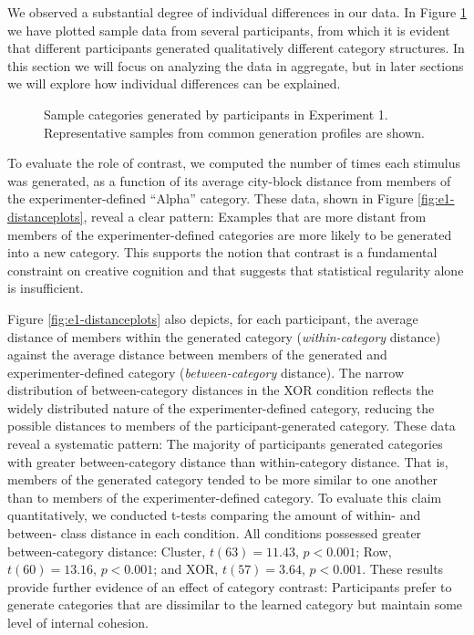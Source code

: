 \documentclass[12pt]{article}
\newcommand\inputpgf[2]{{
\let\pgfimageWithoutPath\pgfimage
\renewcommand{\pgfimage}[2][]{\pgfimageWithoutPath[##1]{#1/##2}}

}}
\begin{document}
\begin{flushleft}
We observed a substantial degree of individual differences in our data. In Figure \ref{fig:e1-samples} we have plotted sample data from several participants, from which it is evident that different participants generated qualitatively different category structures. In this section we will focus on analyzing the data in aggregate, but in later sections we will explore how individual differences can be explained.

\begin{figure}
    \begin{center}
    \inputpgf{figs/}{e1-samples.pgf}
    \caption{Sample categories generated by participants in Experiment 1. Representative samples from common generation profiles are shown.}
    \label{fig:e1-samples}
    \end{center}
\end{figure}

To evaluate the role of contrast, we computed the number of times each stimulus was generated, as a function of its average city-block distance from members of the experimenter-defined ``Alpha'' category. These data, shown in Figure \ref{fig:e1-distanceplots}, reveal a clear pattern: Examples that are more distant from members of the experimenter-defined categories are more likely to be generated into a new category. This supports the notion that contrast is a fundamental constraint on creative cognition and that suggests that statistical regularity alone is insufficient.


Figure \ref{fig:e1-distanceplots} also depicts, for each participant, the average distance of members within the generated category ({\em within-category} distance) against the average distance between members of the generated and experimenter-defined category ({\em between-category} distance). The narrow distribution of between-category distances in the XOR condition reflects the widely distributed nature of the experimenter-defined category, reducing the possible distances to members of the participant-generated category. These data reveal a systematic pattern: The majority of participants generated categories with greater between-category distance than within-category distance. That is, members of the generated category tended to be more similar to one another than to members of the experimenter-defined category. To evaluate this claim quantitatively, we conducted t-tests comparing the amount of within- and between- class distance in each condition. All conditions possessed greater between-category distance: Cluster, $t(63) = 11.43$, $p < 0.001$; Row, $t(60) = 13.16$, $p < 0.001$; and XOR, $t(57) = 3.64$, $p < 0.001$.  These results provide further evidence of an effect of category contrast: Participants prefer to generate categories that are dissimilar to the learned category but maintain some level of internal cohesion. 


\end{flushleft}
\end{document}

